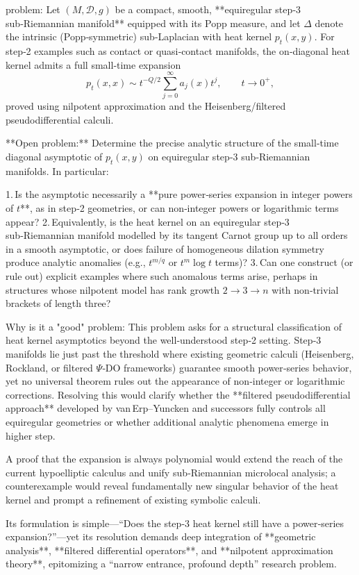 problem:  
Let \((M,\mathcal{D},g)\) be a compact, smooth, **equiregular step‑3 sub‑Riemannian manifold** equipped with its Popp measure, and let \(\Delta\) denote the intrinsic (Popp‑symmetric) sub‑Laplacian with heat kernel \(p_t(x,y)\). For step‑2 examples such as contact or quasi‑contact manifolds, the on‑diagonal heat kernel admits a full small‑time expansion  
\[
p_t(x,x)\sim t^{-Q/2}\sum_{j=0}^\infty a_j(x)t^j,\qquad t\to0^+,
\]
proved using nilpotent approximation and the Heisenberg/filtered pseudodifferential calculi.  

**Open problem:**  
Determine the precise analytic structure of the small‑time diagonal asymptotic of \(p_t(x,y)\) on equiregular step‑3 sub‑Riemannian manifolds. In particular:  

1. Is the asymptotic necessarily a **pure power‑series expansion in integer powers of \(t\)**, as in step‑2 geometries, or can non‑integer powers or logarithmic terms appear?  
2. Equivalently, is the heat kernel on an equiregular step‑3 sub‑Riemannian manifold modelled by its tangent Carnot group up to all orders in a smooth asymptotic, or does failure of homogeneous dilation symmetry produce analytic anomalies (e.g., \(t^{m/q}\) or \(t^{m}\log t\) terms)?  
3. Can one construct (or rule out) explicit examples where such anomalous terms arise, perhaps in structures whose nilpotent model has rank growth \(2\!\to\!3\!\to\!n\) with non‑trivial brackets of length three?  

Why is it a "good" problem:  
This problem asks for a structural classification of heat kernel asymptotics beyond the well‑understood step‑2 setting. Step‑3 manifolds lie just past the threshold where existing geometric calculi (Heisenberg, Rockland, or filtered \(Ψ\)‑DO frameworks) guarantee smooth power‑series behavior, yet no universal theorem rules out the appearance of non‑integer or logarithmic corrections. Resolving this would clarify whether the **filtered pseudodifferential approach** developed by van Erp–Yuncken and successors fully controls all equiregular geometries or whether additional analytic phenomena emerge in higher step.  

A proof that the expansion is always polynomial would extend the reach of the current hypoelliptic calculus and unify sub‑Riemannian microlocal analysis; a counterexample would reveal fundamentally new singular behavior of the heat kernel and prompt a refinement of existing symbolic calculi.  

Its formulation is simple—“Does the step‑3 heat kernel still have a power‑series expansion?”—yet its resolution demands deep integration of **geometric analysis**, **filtered differential operators**, and **nilpotent approximation theory**, epitomizing a “narrow entrance, profound depth” research problem.